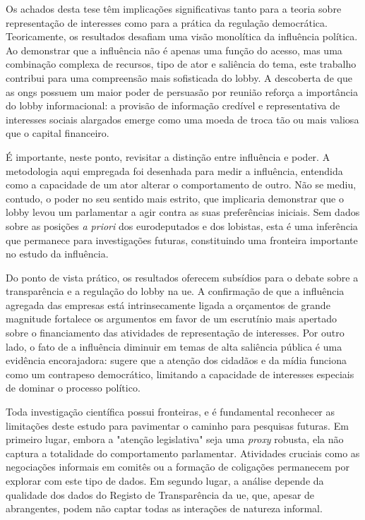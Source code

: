 Os achados desta tese têm implicações significativas tanto para a teoria sobre representação de interesses como para a prática da regulação democrática. Teoricamente, os resultados desafiam uma visão monolítica da influência política. Ao demonstrar que a influência não é apenas uma função do acesso, mas uma combinação complexa de recursos, tipo de ator e saliência do tema, este trabalho contribui para uma compreensão mais sofisticada do lobby. A descoberta de que as \acrshort{ong}s possuem um maior poder de persuasão por reunião reforça a importância do lobby informacional: a provisão de informação credível e representativa de interesses sociais alargados emerge como uma moeda de troca tão ou mais valiosa que o capital financeiro.

É importante, neste ponto, revisitar a distinção entre influência e poder. A metodologia aqui empregada foi desenhada para medir a influência, entendida como a capacidade de um ator alterar o comportamento de outro. Não se mediu, contudo, o poder no seu sentido mais estrito, que implicaria demonstrar que o lobby levou um parlamentar a agir contra as suas preferências iniciais. Sem dados sobre as posições \textit{a priori} dos eurodeputados e dos lobistas, esta é uma inferência que permanece para investigações futuras, constituindo uma fronteira importante no estudo da influência.

Do ponto de vista prático, os resultados oferecem subsídios para o debate sobre a transparência e a regulação do lobby na \acrshort{ue}. A confirmação de que a influência agregada das empresas está intrinsecamente ligada a orçamentos de grande magnitude fortalece os argumentos em favor de um escrutínio mais apertado sobre o financiamento das atividades de representação de interesses. Por outro lado, o fato de a influência diminuir em temas de alta saliência pública é uma evidência encorajadora: sugere que a atenção dos cidadãos e da mídia funciona como um contrapeso democrático, limitando a capacidade de interesses especiais de dominar o processo político.

Toda investigação científica possui fronteiras, e é fundamental reconhecer as limitações deste estudo para pavimentar o caminho para pesquisas futuras. Em primeiro lugar, embora a "atenção legislativa" seja uma \textit{proxy} robusta, ela não captura a totalidade do comportamento parlamentar. Atividades cruciais como as negociações informais em comitês ou a formação de coligações permanecem por explorar com este tipo de dados. Em segundo lugar, a análise depende da qualidade dos dados do Registo de Transparência da \acrshort{ue}, que, apesar de abrangentes, podem não captar todas as interações de natureza informal.

